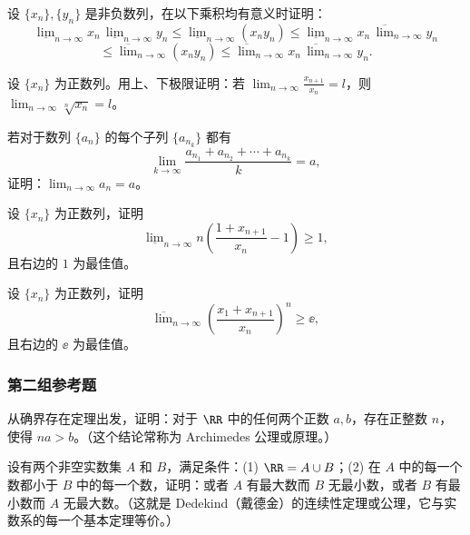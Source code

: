 \begin{xreferenceproblem}[6]
设 $\{x_n\},\{y_n\}$ 是非负数列，在以下乘积均有意义时证明：
  \[
    \underline{\lim}_{n\to\infty}x_n\,
    \underline{\lim}_{n\to\infty}y_n
    \leqslant\underline{\lim}_{n\to\infty}(x_ny_n)
    \leqslant\underline{\lim}_{n\to\infty}x_n\,
    \overline{\lim}_{n\to\infty}y_n
  \]
  \[
    \leqslant\overline{\lim}_{n\to\infty}(x_ny_n)
    \leqslant\overline{\lim}_{n\to\infty}x_n\,
    \overline{\lim}_{n\to\infty}y_n.
  \]
\end{xreferenceproblem}

\begin{xreferenceproblem}[7]
设 $\{x_n\}$ 为正数列。用上、下极限证明：若 $\lim_{n\to\infty}\frac{x_{n+1}}{x_n}=l$，则 $\lim_{n\to\infty}\sqrt[n]{x_n}=l$。
\end{xreferenceproblem}

\begin{xreferenceproblem}[8]
若对于数列 $\{a_n\}$ 的每个子列 $\{a_{n_k}\}$ 都有
  \[
    \lim_{k\to\infty}\frac{a_{n_1}+a_{n_2}+\cdots+a_{n_k}}{k}=a,
  \]
  证明：$\lim_{n\to\infty}a_n=a$。
\end{xreferenceproblem}

\begin{xreferenceproblem}[9]
设 $\{x_n\}$ 为正数列，证明
  \[
    \underline{\lim}_{n\to\infty}n\left(\frac{1+x_{n+1}}{x_n}-1\right)\geqslant1,
  \]
  且右边的 $1$ 为最佳值。
\end{xreferenceproblem}

\begin{xreferenceproblem}[10]
设 $\{x_n\}$ 为正数列，证明
  \[
    \overline{\lim}_{n\to\infty}\left(\frac{x_1+x_{n+1}}{x_n}\right)^n\geqslant\ee,
  \]
  且右边的 $\ee$ 为最佳值。
\end{xreferenceproblem}

\subsubsection*{第二组参考题}

\begin{xreferenceproblem}[1]
从确界存在定理出发，证明：对于 $\RR$ 中的任何两个正数 $a,b$，存在正整数 $n$，使得 $na>b$。（这个结论常称为 Archimedes 公理或原理。）
\end{xreferenceproblem}

\begin{xreferenceproblem}[2]
设有两个非空实数集 $A$ 和 $B$，满足条件：(1) $\RR=A\cup B$；(2) 在 $A$ 中的每一个数都小于 $B$ 中的每一个数，证明：或者 $A$ 有最大数而 $B$ 无最小数，或者 $B$ 有最小数而 $A$ 无最大数。（这就是 Dedekind（戴德金）的连续性定理或公理，它与实数系的每一个基本定理等价。）
\end{xreferenceproblem}

